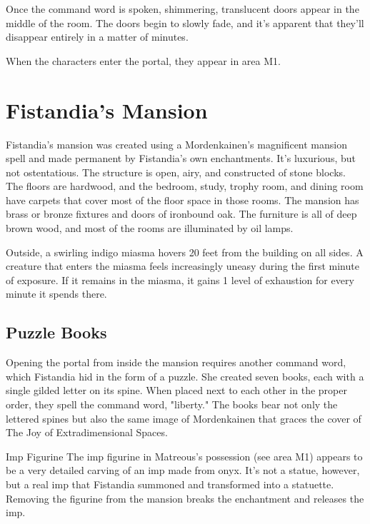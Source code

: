 \documentclass[10pt,a4paper,twoside,bg=print,twocolumn,openany,nodeprecatedcode]{dndbook}
\begin{document}
Once the command word is spoken, shimmering, translucent doors appear in the middle of the room. The doors begin to slowly fade, and it's apparent that they'll disappear entirely in a matter of minutes.

When the characters enter the portal, they appear in area M1.

\section{Fistandia's Mansion}
Fistandia's mansion was created using a Mordenkainen's magnificent mansion spell and made permanent by Fistandia's own enchantments. It's luxurious, but not ostentatious. The structure is open, airy, and constructed of stone blocks. The floors are hardwood, and the bedroom, study, trophy room, and dining room have carpets that cover most of the floor space in those rooms. The mansion has brass or bronze fixtures and doors of ironbound oak. The furniture is all of deep brown wood, and most of the rooms are illuminated by oil lamps.

Outside, a swirling indigo miasma hovers 20 feet from the building on all sides. A creature that enters the miasma feels increasingly uneasy during the first minute of exposure. If it remains in the miasma, it gains 1 level of exhaustion for every minute it spends there.

\subsection{Puzzle Books}
Opening the portal from inside the mansion requires another command word, which Fistandia hid in the form of a puzzle. She created seven books, each with a single gilded letter on its spine. When placed next to each other in the proper order, they spell the command word, "liberty." The books bear not only the lettered spines but also the same image of Mordenkainen that graces the cover of The Joy of Extradimensional Spaces.

\begin{DndSidebar}[float=!b]{Imp Figurine}
The imp figurine in Matreous's possession (see area M1) appears to be a very detailed carving of an imp made from onyx. It's not a statue, however, but a real imp that Fistandia summoned and transformed into a statuette. Removing the figurine from the mansion breaks the enchantment and releases the imp.



\end{DndSidebar}
\end{document}
